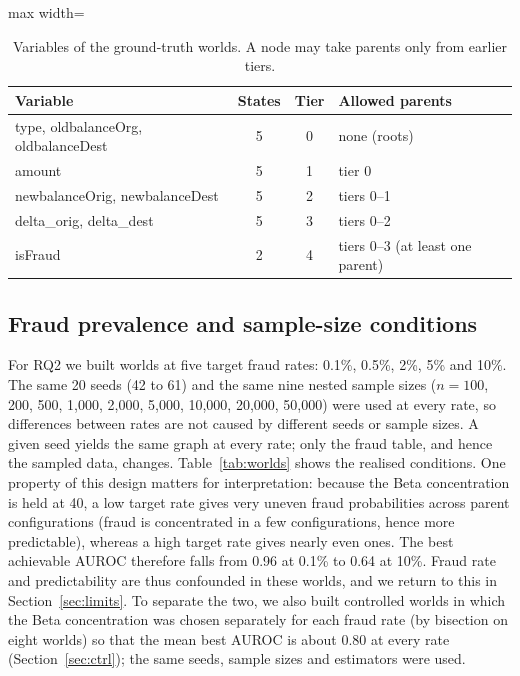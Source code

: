 \documentclass[final,5p,times,authoryear]{elsarticle}
\begin{document}
\begin{table}[H]
\centering\small
\begin{adjustbox}{max width=\linewidth}
\begin{tabular}{lccl}\toprule
Variable & States & Tier & Allowed parents\\\midrule
type, oldbalanceOrg, oldbalanceDest & 5 & 0 & none (roots)\\
amount & 5 & 1 & tier 0\\
newbalanceOrig, newbalanceDest & 5 & 2 & tiers 0--1\\
delta\_orig, delta\_dest & 5 & 3 & tiers 0--2\\
isFraud & 2 & 4 & tiers 0--3 (at least one parent)\\\bottomrule
\end{tabular}
\end{adjustbox}
\caption{Variables of the ground-truth worlds. A node may take parents only from earlier tiers.}\label{tab:vars}
\end{table}

\subsection{Fraud prevalence and sample-size conditions}
For RQ2 we built worlds at five target fraud rates: 0.1\%, 0.5\%, 2\%, 5\% and 10\%. The same 20 seeds (42 to 61) and the same nine nested sample sizes ($n=100$, 200, 500, 1,000, 2,000, 5,000, 10,000, 20,000, 50,000) were used at every rate, so differences between rates are not caused by different seeds or sample sizes. A given seed yields the same graph at every rate; only the fraud table, and hence the sampled data, changes. Table~\ref{tab:worlds} shows the realised conditions. One property of this design matters for interpretation: because the Beta concentration is held at 40, a low target rate gives very uneven fraud probabilities across parent configurations (fraud is concentrated in a few configurations, hence more predictable), whereas a high target rate gives nearly even ones. The best achievable AUROC therefore falls from 0.96 at 0.1\% to 0.64 at 10\%. Fraud rate and predictability are thus confounded in these worlds, and we return to this in Section~\ref{sec:limits}. To separate the two, we also built controlled worlds in which the Beta concentration was chosen separately for each fraud rate (by bisection on eight worlds) so that the mean best AUROC is about 0.80 at every rate (Section~\ref{sec:ctrl}); the same seeds, sample sizes and estimators were used.
\end{document}
